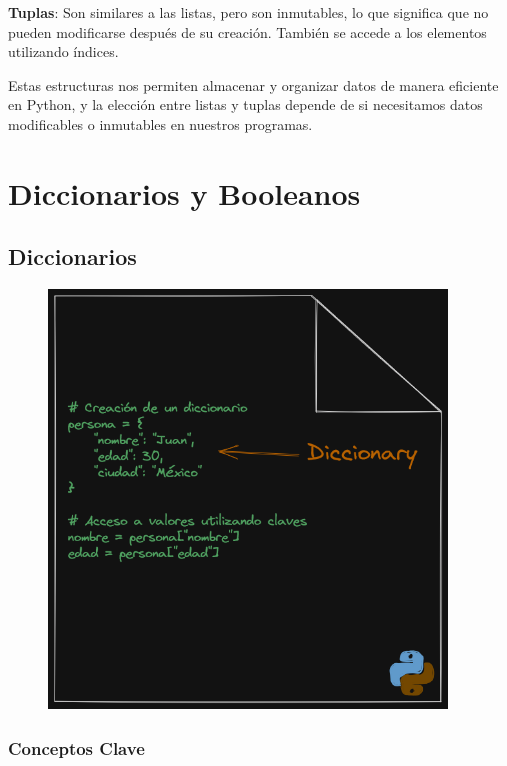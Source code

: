 \documentclass[
  a4paper,
  DIV=11,
  numbers=noendperiod,
  onepage,
  openany]{scrreprt}
\begin{document}
\textbf{Tuplas}: Son similares a las listas, pero son inmutables, lo que
significa que no pueden modificarse después de su creación. También se
accede a los elementos utilizando índices.

Estas estructuras nos permiten almacenar y organizar datos de manera
eficiente en Python, y la elección entre listas y tuplas depende de si
necesitamos datos modificables o inmutables en nuestros programas.

\chapter{Diccionarios y Booleanos}\label{diccionarios-y-booleanos}

\section{Diccionarios}\label{diccionarios}

\begin{figure}

{\centering \includegraphics[width=4.16667in,height=\textheight]{unidades/unidad3/images/diccionary.png}

}

\end{figure}

\subsection{Conceptos Clave}\label{conceptos-clave-9}
\end{document}
